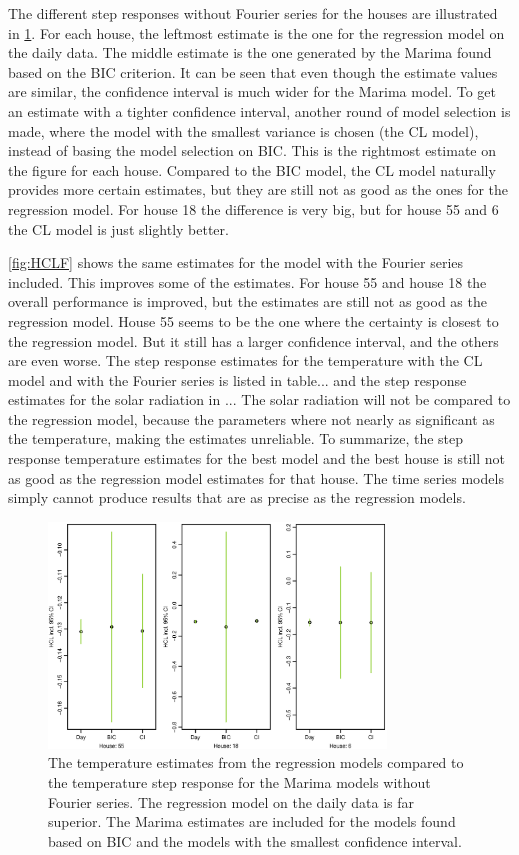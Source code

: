 \noindent The different step responses without Fourier series for the houses are illustrated in \cref{fig:HCL}. For each house, the leftmost estimate is the one for the regression model on the daily data. The middle estimate is the one generated by the Marima found based on the BIC criterion. It can be seen that even though the estimate values are similar, the confidence interval is much wider for the Marima model. To get an estimate with a tighter confidence interval, another round of model selection is made, where the model with the smallest variance is chosen (the CL model), instead of basing the model selection on BIC. This is the rightmost estimate on the figure for each house. Compared to the BIC model, the CL model naturally provides more certain estimates, but they are still not as good as the ones for the regression model. For house 18 the difference is very big, but for house 55 and 6 the CL model is just slightly better.

\noindent \cref{fig:HCLF} shows the same estimates for the model with the Fourier series included. This improves some of the estimates. For house 55 and house 18 the overall performance is improved, but the estimates are still not as good as the regression model. House 55 seems to be the one where the certainty is closest to the regression model. But it still has a larger confidence interval, and the others are even worse. The step response estimates for the temperature with the CL model and with the Fourier series is listed in table... and the step response estimates for the solar radiation in ...  The solar radiation will not be compared to the regression model, because the parameters where not nearly as significant as the temperature, making the estimates unreliable. To summarize, the step response temperature estimates for the best model and the best house is still not as good as the regression model estimates for that house. The time series models simply cannot produce results that are as precise as the regression models.


\begin{figure}
    \centering
    \includegraphics[width=0.8\textwidth]{../../../figures/MarimaHCL.eps}
    \caption{The temperature estimates from the regression models compared to the temperature step response for the Marima models without Fourier series. The regression model on the daily data is far superior. The Marima estimates are included for the models found based on BIC and the models with the smallest confidence interval.}
    \label{fig:HCL}
\end{figure}

